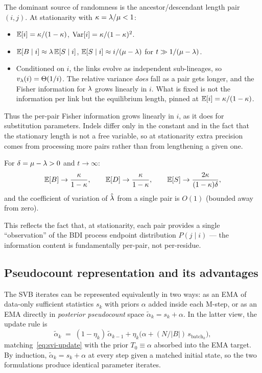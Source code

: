 The dominant source of randomness is the ancestor/descendant length pair $(i,j)$.
At stationarity with $\kappa = \lambda/\mu < 1$:
\begin{itemize}
\item $\mathbb{E}[i] = \kappa/(1-\kappa)$, \quad
  $\mathrm{Var}[i] = \kappa/(1-\kappa)^2$.
\item $\mathbb{E}[B \mid i] \approx \lambda\,\mathbb{E}[S \mid i]$, \quad
  $\mathbb{E}[S \mid i] \approx i/({\mu - \lambda})$ for $t \gg 1/(\mu-\lambda)$.
\item Conditioned on $i$, the links evolve as independent sub-lineages,
  so $v_\lambda(i) = \Theta(1/i)$. The relative variance \emph{does}
  fall as a pair gets longer, and the Fisher information for $\lambda$
  grows linearly in $i$. What is fixed is not the information per link
  but the equilibrium length, pinned at $\mathbb{E}[i] = \kappa/(1-\kappa)$.
\end{itemize}
Thus the per-pair Fisher information grows linearly in $i$, as it does
for substitution parameters. Indels differ only in the constant and in
the fact that the stationary length is not a free variable, so at
stationarity extra precision comes from processing more pairs rather
than from lengthening a given one.

\begin{proposition}
For $\delta = \mu - \lambda > 0$ and $t \to \infty$:
\[
\mathbb{E}[B] \to \frac{\kappa}{1-\kappa}, \qquad
\mathbb{E}[D] \to \frac{\kappa}{1-\kappa}, \qquad
\mathbb{E}[S] \to \frac{2\kappa}{(1-\kappa)\delta},
\]
and the coefficient of variation of $\hat{\lambda}$ from a single pair
is $O(1)$ (bounded away from zero).
\end{proposition}

This reflects the fact that, at stationarity, each pair provides a
single ``observation'' of the BDI process endpoint distribution
$P(j \mid i)$ --- the information content is fundamentally per-pair,
not per-residue.

\subsection{Pseudocount representation and its advantages}
\label{sec:pseudocount-view}

The SVB iterates can be represented equivalently in two ways: as an
EMA of data-only sufficient statistics $s_k$ with priors $\alpha$
added inside each M-step, or as an EMA directly in
\emph{posterior pseudocount} space
$\tilde{\alpha}_k = s_k + \alpha$.  In the latter view, the update
rule is
\begin{equation}\label{eq:ema-pseudocount}
  \tilde{\alpha}_k
  \;=\; (1 - \eta_k)\,\tilde{\alpha}_{k-1}
        + \eta_k\bigl(\alpha + (N/|B|)\,s_{\text{batch}_k}\bigr),
\end{equation}
matching~\eqref{eq:svi-update} with the prior $T_0 \equiv \alpha$
absorbed into the EMA target.  By induction, $\tilde{\alpha}_k = s_k + \alpha$
at every step given a matched initial state, so the two formulations
produce identical parameter iterates.

